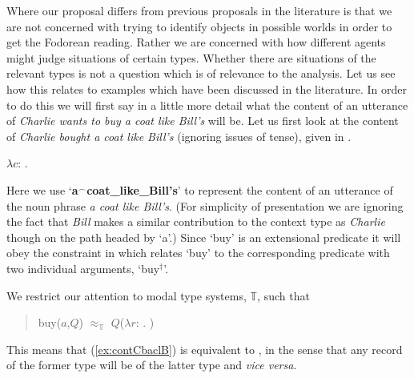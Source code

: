 Where our proposal differs from previous proposals in the literature
is that we are not concerned with trying to identify
objects in possible worlds in order to get the Fodorean reading.
Rather we are concerned with how different agents might judge
situations of certain types.  Whether there are situations of the
relevant types is not a question which is of relevance to the
analysis.  Let us see how this relates to examples which have been
discussed in the literature.  
In order to do this we will first say in a little more detail what the
content of an utterance of \textit{Charlie wants to buy a coat like
  Bill's} will be.  Let us first look at the content of
\textit{Charlie bought a coat like Bill's} (ignoring issues of tense), given in \nexteg{}.
\begin{ex}
  $\lambda c$: . 
\label{ex:contCbaclB} 
\end{ex} 
Here we use `\textbf{a$^\frown$coat\_like\_Bill's}' to represent the
  content of an utterance of the noun phrase \textit{a coat like
    Bill's}.  (For simplicity of presentation we are ignoring the fact
  that \textit{Bill} makes a similar contribution to the context type
  as \textit{Charlie} though on the path headed by `a'.)
Since `buy' is an extensional predicate it will obey the constraint in
\nexteg{} which relates `buy' to the corresponding predicate with two
individual arguments, `buy$^\dagger$'.
\begin{ex}
  We restrict our attention to modal type systems, $\mathbb{T}$, such
  that
  \begin{quote}
buy($a$,$Q$) $\approx_{\mathbb{T}}$ $Q$($\lambda
r$:
. )
\end{quote}
\end{ex} 
This means that (\ref{ex:contCbaclB}) is equivalent to \nexteg{}, in
the sense that any record of the former type will be of the latter
type and \textit{vice versa}.
